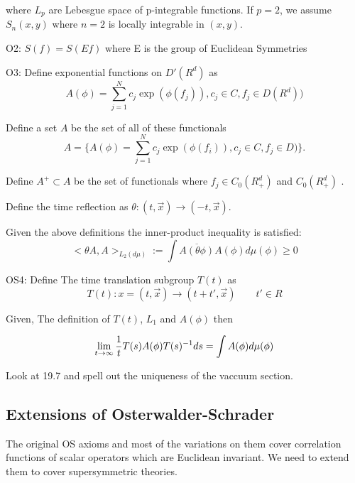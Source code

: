 \documentclass{article}
\newcommand{\1}{\mathbbm{1}}
\theoremstyle{plain}
\theoremstyle{definition}
\numberwithin{equation}{section}
\begin{document}
where $L_p$ are Lebesgue space of p-integrable functions.
If \(p=2\), we assume $S_n(x,y)$ where $n=2$ is locally integrable in $(x,y)$.

 O2: $S(f)= S(Ef)$ where E is the group of Euclidean Symmetries

 O3: Define exponential functions on $D'(R^d)$ as
    \begin{equation}
         A(\phi)= \sum_{j=1}^N c_j \exp (\phi(f_j)), c_j \in C, f_j \in D(R^d))
    \end{equation}

Define a set $A$ be the set of all of these functionals
      \begin{equation}
        A = \{ A(\phi)= \sum_{j=1}^N c_j \exp (\phi(f_i)), c_j \in C, f_j \in D)\}.
    \end{equation}
     

   Define $A^+ \subset  A $ be the set of functionals where $f_j \in C_0(R_{+}^d)$ and $C_0(R_{+}^d)$ .
   
   Define the time reflection as $\theta: (t , \vec{x}) \rightarrow (-t, \vec{x})$. 
   
   Given the above definitions the inner-product inequality is satisfied:  
     \begin{equation}
         < \theta A, A >_{L_2(d \mu)}:= \int \overline{A(\theta \phi)} A(\phi) d \mu(\phi)\geq 0 
     \end{equation}
     
   OS4: 
   Define The time translation subgroup $T(t)$ as 
    \begin{equation}
        T(t) : x = (t, \vec{x})\rightarrow (t+ t', \vec{x}) \qquad t'\in R 
    \end{equation}


Given, The definition of $T(t)$, $L_1$ and $A(\phi)$ then 

\begin{equation}
    \lim_{t \rightarrow \infty} {1 \over t} T(s) A(\phi) T(s)^{-1} ds = \int A (\phi) d \mu(\phi)
\end{equation}

 Look at 19.7 and spell out the uniqueness of the vaccuum section. 



\subsection{Extensions of Osterwalder-Schrader}

The original OS axioms and most of the variations on them cover correlation functions of scalar operators which
are Euclidean invariant.  We need to extend them to cover supersymmetric theories.
\end{document}
